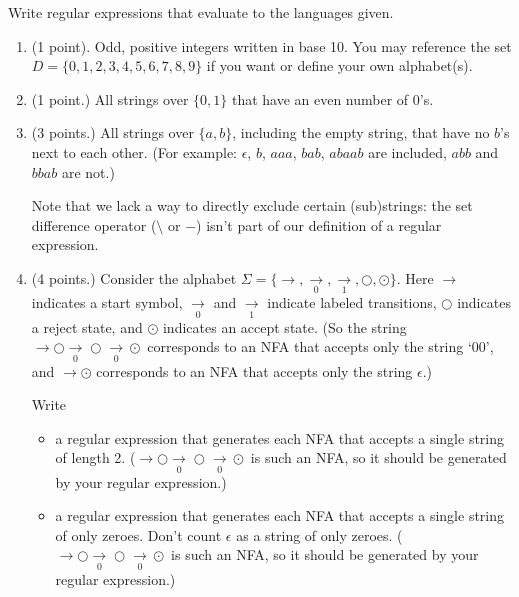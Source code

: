 \documentclass[letterpaper,11pt,twoside]{article}
\theoremstyle{plain}
\theoremstyle{definition}
\theoremstyle{remark}
\theoremstyle{restate}
\begin{document}
Write regular expressions that evaluate to the languages given.
\begin{enumerate}[resume]
    \item (1 point). Odd, positive integers written in base 10. You may reference the set $D = \{0, 1, 2, 3, 4, 5, 6, 7, 8, 9\}$ if you want or define your own alphabet(s).
    
    \item (1 point.) All strings over $\{0, 1\}$ that have an even number of 0's.

    \item (3 points.) All strings over $\{a, b\}$, including the empty string, that have no $b$'s next to each other. (For example: $\epsilon$, $b$, $aaa$, $bab$, $abaab$ are included, $abb$ and $bbab$ are not.)

    Note that we lack a way to directly exclude certain (sub)strings: the set difference operator ($\setminus$ or $-$) isn't part of our definition of a regular expression.

    \item (4 points.) Consider the alphabet $\Sigma = \{\rightarrow, \underset{0}{\rightarrow}, \underset{1}{\rightarrow}, \bigcirc, \odot\}$. Here $\rightarrow$ indicates a start symbol, $\underset{0}{\rightarrow}$ and $\underset{1}{\rightarrow}$ indicate labeled transitions, $\bigcirc$ indicates a reject state, and $\odot$ indicates an accept state. (So the string $\rightarrow \bigcirc \underset{0}{\rightarrow} \bigcirc \underset{0}{\rightarrow} \odot$ corresponds to an NFA that accepts only the string `00', and $\rightarrow \odot$ corresponds to an NFA that accepts only the string $\epsilon$.)
    
    Write 
    \begin{itemize}
        \item a regular expression that generates each NFA that accepts a single string of length 2. ($\rightarrow \bigcirc \underset{0}{\rightarrow} \bigcirc \underset{0}{\rightarrow} \odot$ is such an NFA, so it should be generated by your regular expression.)
        \item a regular expression that generates each NFA that accepts a single string of only zeroes. Don't count $\epsilon$ as a string of only zeroes. ($\rightarrow \bigcirc \underset{0}{\rightarrow} \bigcirc \underset{0}{\rightarrow} \odot$ is such an NFA, so it should be generated by your regular expression.)
    \end{itemize}
\end{enumerate}
\end{document}
